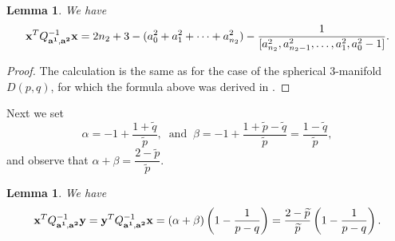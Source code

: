 \documentclass[11pt]{amsart}
\theoremstyle{plain}
\newtheorem{lemma}[theorem]{Lemma}
\theoremstyle{definition}
\theoremstyle{remark}
\numberwithin{theorem}{section}
\begin{document}
\begin{lemma} \label{lem: dpq} We have 
\begin{equation} \label{eq: dpq} 
{\bf x}^T Q^{-1}_{{\bf a^1}, {\bf a^2}} {\bf x} = 2n_2+3-(a^2_0 +a^2_1+\cdots+a^2_{n_2}) - \dfrac{1}{[a^2_{n_2}, a^2_{n_2-1}, \ldots, a^2_1, a^2_0-1]}.\end{equation} 
\end{lemma}

\begin{proof} The calculation is the same as for the case of the spherical $3$-manifold $D(p,q)$, for which the formula above was derived  in \cite[Lemma 9.7]{EtnyreOzbagciTosun2025}. \end{proof} 
Next we set $$\alpha = -1 + \dfrac{1+\widetilde{q}}{\widetilde{p}}, \;\; \mbox{and} \;\; \beta = -1 + \dfrac{1+\widetilde{p}-\widetilde{q}}{\widetilde{p}}= \dfrac{1-\widetilde{q}}{\widetilde{p}}, $$ and observe that $\alpha +\beta= \dfrac{2-\widetilde{p}}{\widetilde{p}}$. 

\begin{lemma} \label{lem: xy} 
We have 
\begin{equation} \label{eq: xy}  
{\bf x}^T Q^{-1}_{{\bf a^1}, {\bf a^2}} {\bf y} = {\bf y}^T Q^{-1}_{{\bf a^1}, {\bf a^2}} {\bf x} = (\alpha+\beta) \left(1 - \dfrac{1}{p-q}\right) =\dfrac{2-\widetilde{p}}{\widetilde{p}}\left(1 - \dfrac{1}{p-q}\right). 
\end{equation}
\end{lemma}
\end{document}

